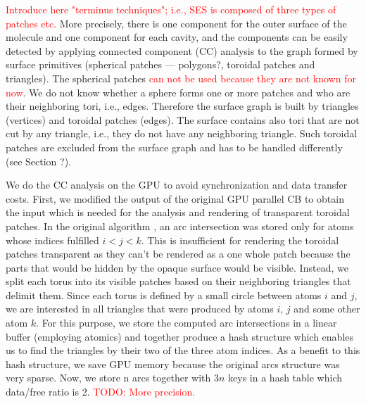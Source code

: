 \textcolor{red}{Introduce here "terminus techniques"; i.e., SES is composed of three types of patches etc.}
More precisely, there is one component for the outer surface of the molecule and one component for each cavity, and the components can be easily detected by applying connected component (CC) analysis to the graph formed by surface primitives (spherical patches --- polygons?, toroidal patches and triangles).
The spherical patches \textcolor{red}{can not be used because they are not known for now}.
We do not know whether a sphere forms one or more patches and who are their neighboring tori, i.e., edges.
Therefore the surface graph is built by triangles (vertices) and toroidal patches (edges).
The surface contains also tori that are not cut by any triangle, i.e., they do not have any neighboring triangle.
Such toroidal patches are excluded from the surface graph and has to be handled differently (see Section ?).

We do the CC analysis on the GPU to avoid synchronization and data transfer costs.
First, we modified the output of the original GPU parallel CB to obtain the input which is needed for the analysis and rendering of transparent toroidal patches.
In the original algorithm \cite{krone2011parallel}, an arc intersection was stored only for atoms whose indices fulfilled $i < j < k$.
This is insufficient for rendering the toroidal patches transparent as they can't be rendered as a one whole patch because the parts that would be hidden by the opaque surface would be visible.
Instead, we split each torus into its visible patches based on their neighboring triangles that delimit them.
Since each torus is defined by a small circle between atoms $i$ and $j$, we are interested in all triangles that were produced by atoms $i$, $j$ and some other atom $k$.
For this purpose, we store the computed arc intersections in a linear buffer (employing atomics) and together produce a hash structure which enables us to find the triangles by their two of the three atom indices.
As a benefit to this hash structure, we save GPU memory because the original arcs structure was very sparse.
Now, we store n arcs together with $3 n$ keys in a hash table which data/free ratio is 2. \textcolor{red}{TODO: More precision.}

